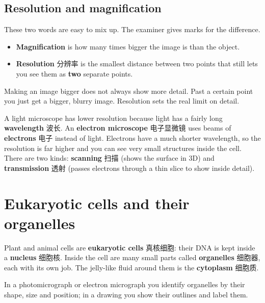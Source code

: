 \documentclass[11pt]{article}
\begin{document}
\subsection*{Resolution and magnification}

These two words are easy to mix up. The examiner gives marks for the difference.

\begin{itemize}
\item \textbf{Magnification} is how many times bigger the image is than the object.

\item \textbf{Resolution} 分辨率 is the smallest distance between two points that still lets you see them as \textbf{two} separate points.

\end{itemize}

Making an image bigger does not always show more detail. Past a certain point you just get a bigger, blurry image. Resolution sets the real limit on detail.

A light microscope has lower resolution because light has a fairly long \textbf{wavelength} 波长. An \textbf{electron microscope} 电子显微镜 uses beams of \textbf{electrons} 电子 instead of light. Electrons have a much shorter wavelength, so the resolution is far higher and you can see very small structures inside the cell. There are two kinds: \textbf{scanning} 扫描 (shows the surface in 3D) and \textbf{transmission} 透射 (passes electrons through a thin slice to show inside detail).

\section*{Eukaryotic cells and their organelles}

Plant and animal cells are \textbf{eukaryotic cells} 真核细胞: their DNA is kept inside a \textbf{nucleus} 细胞核. Inside the cell are many small parts called \textbf{organelles} 细胞器, each with its own job. The jelly-like fluid around them is the \textbf{cytoplasm} 细胞质.

In a photomicrograph or electron micrograph you identify organelles by their shape, size and position; in a drawing you show their outlines and label them.
\end{document}

